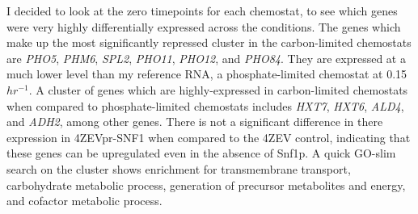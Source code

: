 \documentclass[letter]{article}\usepackage{graphicx, color}
\begin{document}
I decided to look at the zero timepoints for each chemostat, to see which genes were very highly differentially expressed across the conditions. The genes which make up the most significantly repressed cluster in the carbon-limited chemostats are \emph{PHO5}, \emph{PHM6}, \emph{SPL2}, \emph{PHO11}, \emph{PHO12}, and \emph{PHO84}. They are expressed at a much lower level than my reference RNA, a phosphate-limited chemostat at 0.15$hr^{-1}$. A cluster of genes which are highly-expressed in carbon-limited chemostats when compared to phosphate-limited chemostats includes \emph{HXT7}, \emph{HXT6}, \emph{ALD4}, and \emph{ADH2}, among other genes. There is not a significant difference in there expression in 4ZEVpr-SNF1 when compared to the 4ZEV control, indicating that these genes can be upregulated even in the absence of Snf1p. A quick GO-slim search on the cluster shows enrichment for transmembrane transport, carbohydrate metabolic process, generation of precursor metabolites and energy, and cofactor metabolic process.
\end{document}
